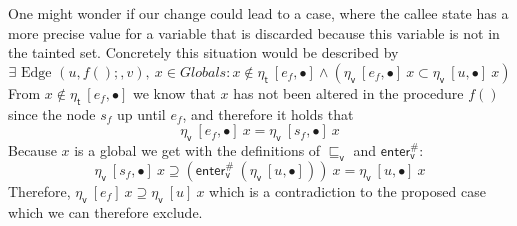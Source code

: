     One might wonder if our change could lead to a case, where the callee state has a more precise value for a variable that is discarded because this variable is not in the tainted set. Concretely this situation would be described by 
    \[\exists \text{ Edge }(u, f();, v),\ x \in Globals: x \notin \eta_\textsf{t}\ [e_f, \bullet] \land (\eta_\textsf{v}\ [e_f, \bullet]\ x\subset \eta_\textsf{v}\ [u, \bullet]\ x)\]
    From $x \notin \eta_\textsf{t}\ [e_f, \bullet]$ we know that $x$ has not been altered in the procedure $f()$ since the node $s_f$ up until $e_f$, and therefore it holds that 
    \[\eta_\textsf{v}\ [e_f, \bullet]\ x = \eta_\textsf{v}\ [s_f, \bullet]\ x\]
    Because $x$ is a global we get with the definitions of $\sqsubseteq_\textsf{v}$ and $\textsf{enter}^{\#}_\textsf{v}$: 
    \[\eta_\textsf{v}\ [s_f, \bullet]\ x \supseteq (\textsf{enter}^{\#}_\textsf{v}\ (\eta_\textsf{v}\ [u, \bullet]))\ x = \eta_\textsf{v}\ [u, \bullet]\ x\]
    Therefore, $\eta_\textsf{v}\ [e_f]\ x\supseteq \eta_\textsf{v}\ [u]\ x$ which is a contradiction to the proposed case which we can therefore exclude.

